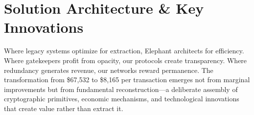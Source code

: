 \chapter{Solution Architecture \& Key Innovations}

Where legacy systems optimize for extraction, Elephant architects for efficiency. Where gatekeepers profit from opacity, our protocols create transparency. Where redundancy generates revenue, our networks reward permanence. The transformation from \$67{,}532 to \$8{,}165 per transaction emerges not from marginal improvements but from fundamental reconstruction—a deliberate assembly of cryptographic primitives, economic mechanisms, and technological innovations that create value rather than extract it.

